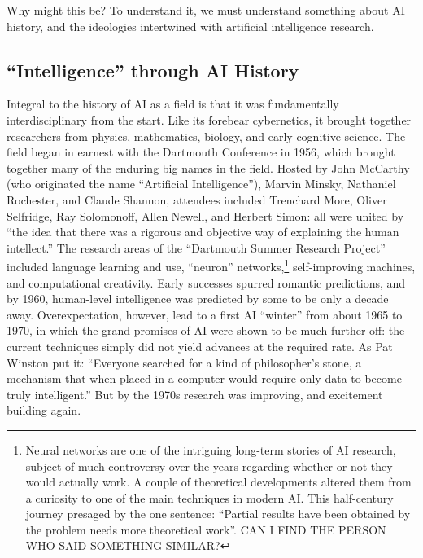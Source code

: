 Why might this be? To understand it, we must understand something
about AI history, and the ideologies intertwined with artificial
intelligence research.

\subsection{``Intelligence'' through AI History}

Integral to the history of AI as a field is that it was fundamentally
interdisciplinary from the start. Like its forebear cybernetics, it
brought together researchers from physics, mathematics, biology, and
early cognitive science. The field began in earnest with the Dartmouth
Conference in 1956, which brought together many of the enduring big
names in the field. Hosted by John McCarthy (who originated the name
``Artificial Intelligence''), Marvin Minsky, Nathaniel Rochester, and
Claude Shannon, attendees included Trenchard More, Oliver Selfridge,
Ray Solomonoff, Allen Newell, and Herbert Simon: all were united by
``the idea that there was a rigorous and objective way of explaining
the human intellect.''\cite[Ch. 5]{mccorduck} The research areas of
the ``Dartmouth Summer Research Project'' included language learning
and use, ``neuron'' networks,\footnote{Neural networks are one of the
  intriguing long-term stories of AI research, subject of much
  controversy over the years regarding whether or not they would
  actually work. A couple of theoretical developments altered them
  from a curiosity to one of the main techniques in modern AI. This
  half-century journey presaged by the one sentence: ``Partial
  results have been obtained by the problem needs more theoretical
  work''.\cite{dartmouthconf} CAN I FIND THE PERSON WHO SAID SOMETHING
SIMILAR?} self-improving machines, and computational 
creativity.\cite{dartmouthconf} Early successes spurred romantic
predictions, and by 1960, human-level intelligence was predicted by
some to be only a decade away.\cite[p. 3]{winston} Overexpectation, however,
lead to a first AI ``winter'' from about 1965 to 1970, in which the
grand promises of AI were shown to be much further off: the current
techniques simply did not yield advances at the required rate. As Pat
Winston put it: ``Everyone searched for a kind of philosopher's stone,
a mechanism that when placed in a computer would require only data to
become truly intelligent.''\cite[p. 4]{winston} But by the 1970s
research was improving, and excitement building again.


